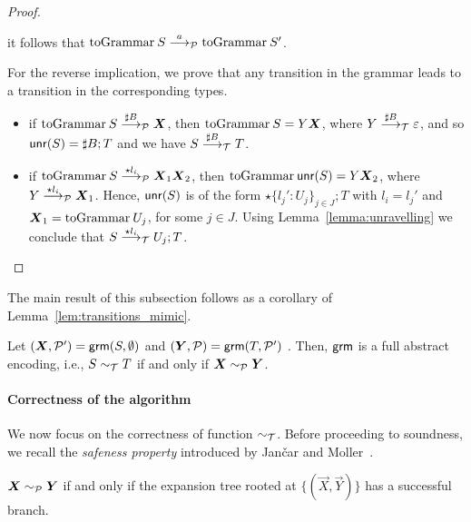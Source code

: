 \begin{proof}
\begin{itemize}
		it follows that
		$\toGrammarf{S}\LTSderivesP \toGrammarf{S'}$.\smallskip
	\end{itemize}
	For the reverse implication, we prove that any transition in the
	grammar leads to a transition in the corresponding types.
	\begin{itemize}
		\item if $\toGrammarf{S}\LTSderivesP[\sharp B] \vec X$, then
		$\toGrammarf{S} = Y \vec X$, where $Y\LTSderives[\sharp B] \varepsilon$,
		and so $\Unravel(S) = \sharp B; T$ and we have $S\LTSderives[\sharp B] T$.
		\item if $\toGrammarf{S} \LTSderivesP[\star l_i] \vec X_1 \vec X_2$, then
		$\toGrammarf{\Unravel(S)} = Y \vec X_2$, where $Y\LTSderivesP[\star l_i] \vec X_1$.
		Hence, $\Unravel (S)$ is of the form $\star\{l_j' :U_j\}_{j\in J};T$ with $l_i = l_j'$ and
		$\vec X_1 = \toGrammarf{U_j}$, for some $j\in J$. Using 
		Lemma~\ref{lemma:unravelling} we conclude that 
		$S \LTSderives[\star l_i] U_j ; T$.
	\end{itemize}
\end{proof}


The main result of this subsection follows as a corollary
of Lemma~\ref{lem:transitions_mimic}.

\newcommand{\grmcontext}{
  $(\vec X, \productions') = \grm(S, \emptyset)$ and 
  $(\vec Y, \productions) = \grm(T, \productions')$%
}

\begin{theorem}
  \label{thm:equiv_coincide}
  Let \grmcontext. Then, $\grm$ is a full abstract encoding, i.e.,
  $S \TypeEquiv T$ if and only if $\vec X \ProdEquiv \vec Y$.
\end{theorem}

\paragraph{Correctness of the algorithm}

We now focus on the correctness of function $\bisim$.  Before
proceeding to soundness, we recall the \emph{safeness property}
introduced by Jan{\v{c}}ar and Moller~\cite{janvcar1999techniques}.

\begin{lemma} 
  \label{lem:safeness}
  $\vec X \ProdEquiv \vec Y$ if and only if the expansion tree rooted
  at $\{(\vec X, \vec Y)\}$ has a successful branch.
\end{lemma}

